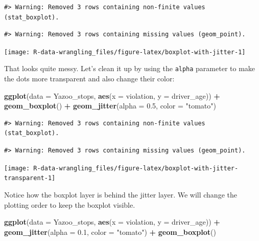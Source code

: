 \documentclass[]{book}
\newenvironment{Shaded}{\begin{snugshade}}{\end{snugshade}}
\newcommand{\DataTypeTok}[1]{\textcolor[rgb]{0.13,0.29,0.53}{#1}}
\newcommand{\FloatTok}[1]{\textcolor[rgb]{0.00,0.00,0.81}{#1}}
\newcommand{\KeywordTok}[1]{\textcolor[rgb]{0.13,0.29,0.53}{\textbf{#1}}}
\newcommand{\NormalTok}[1]{#1}
\newcommand{\OperatorTok}[1]{\textcolor[rgb]{0.81,0.36,0.00}{\textbf{#1}}}
\newcommand{\StringTok}[1]{\textcolor[rgb]{0.31,0.60,0.02}{#1}}
\begin{document}
\begin{verbatim}
#> Warning: Removed 3 rows containing non-finite values (stat_boxplot).
\end{verbatim}

\begin{verbatim}
#> Warning: Removed 3 rows containing missing values (geom_point).
\end{verbatim}

\texttt{[image: R-data-wrangling\_files/figure-latex/boxplot-with-jitter-1]}

That looks quite messy. Let's clean it up by using the \texttt{alpha} parameter to make the dots more transparent and also change their color:

\begin{Shaded}
\begin{Highlighting}[]
\KeywordTok{ggplot}\NormalTok{(}\DataTypeTok{data =}\NormalTok{ Yazoo_stops, }\KeywordTok{aes}\NormalTok{(}\DataTypeTok{x =}\NormalTok{ violation, }\DataTypeTok{y =}\NormalTok{ driver_age)) }\OperatorTok{+}
\StringTok{    }\KeywordTok{geom_boxplot}\NormalTok{() }\OperatorTok{+}
\StringTok{    }\KeywordTok{geom_jitter}\NormalTok{(}\DataTypeTok{alpha =} \FloatTok{0.5}\NormalTok{, }\DataTypeTok{color =} \StringTok{"tomato"}\NormalTok{)}
\end{Highlighting}
\end{Shaded}

\begin{verbatim}
#> Warning: Removed 3 rows containing non-finite values (stat_boxplot).
\end{verbatim}

\begin{verbatim}
#> Warning: Removed 3 rows containing missing values (geom_point).
\end{verbatim}

\texttt{[image: R-data-wrangling\_files/figure-latex/boxplot-with-jitter-transparent-1]}

Notice how the boxplot layer is behind the jitter layer. We will change the plotting order to keep the boxplot visible.

\begin{Shaded}
\begin{Highlighting}[]
\KeywordTok{ggplot}\NormalTok{(}\DataTypeTok{data =}\NormalTok{ Yazoo_stops, }\KeywordTok{aes}\NormalTok{(}\DataTypeTok{x =}\NormalTok{ violation, }\DataTypeTok{y =}\NormalTok{ driver_age)) }\OperatorTok{+}
\StringTok{    }\KeywordTok{geom_jitter}\NormalTok{(}\DataTypeTok{alpha =} \FloatTok{0.1}\NormalTok{, }\DataTypeTok{color =} \StringTok{"tomato"}\NormalTok{) }\OperatorTok{+}\StringTok{ }
\StringTok{    }\KeywordTok{geom_boxplot}\NormalTok{()}
\end{Highlighting}
\end{Shaded}
\end{document}
